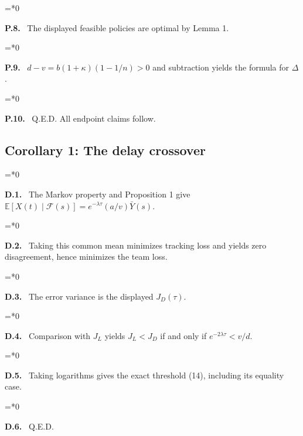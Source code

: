 \documentclass[11pt,letterpaper]{article}
\newcommand{\E}{\mathbb E}
\newenvironment{proofstep}[2]{%
  \begin{list}{}{\leftmargin=\dimexpr 0.17in*#2\relax%
  \setlength{\rightmargin}{0pt}\setlength{\topsep}{5pt}\setlength{\parsep}{2pt}}%
  \item[]\textbf{\textcolor{ink}{#1.}}\ }{\end{list}}
\begin{document}
\begin{proofstep}{P.8}{0}
The displayed feasible policies are optimal by Lemma 1.
\par\nopagebreak{}
\end{proofstep}
\begin{proofstep}{P.9}{0}
$d-v=b(1+\kappa)(1-1/n)>0$ and subtraction yields the formula for $\Delta$.
\par\nopagebreak{}
\end{proofstep}
\begin{proofstep}{P.10}{0}
Q.E.D. All endpoint claims follow.
\par\nopagebreak{}
\end{proofstep}
\subsection{Corollary 1: The delay crossover}
\begin{proofstep}{D.1}{0}
The Markov property and Proposition 1 give $\E[X(t)\mid\mathcal F(s)]=e^{-\lambda\tau}(a/v)\bar Y(s)$.
\par\nopagebreak{}
\end{proofstep}
\begin{proofstep}{D.2}{0}
Taking this common mean minimizes tracking loss and yields zero disagreement, hence minimizes the team loss.
\par\nopagebreak{}
\end{proofstep}
\begin{proofstep}{D.3}{0}
The error variance is the displayed $J_D(\tau)$.
\par\nopagebreak{}
\end{proofstep}
\begin{proofstep}{D.4}{0}
Comparison with $J_L$ yields $J_L<J_D$ if and only if $e^{-2\lambda\tau}<v/d$.
\par\nopagebreak{}
\end{proofstep}
\begin{proofstep}{D.5}{0}
Taking logarithms gives the exact threshold (14), including its equality case.
\par\nopagebreak{}
\end{proofstep}
\begin{proofstep}{D.6}{0}
Q.E.D.
\par\nopagebreak{}
\end{proofstep}
\end{document}
